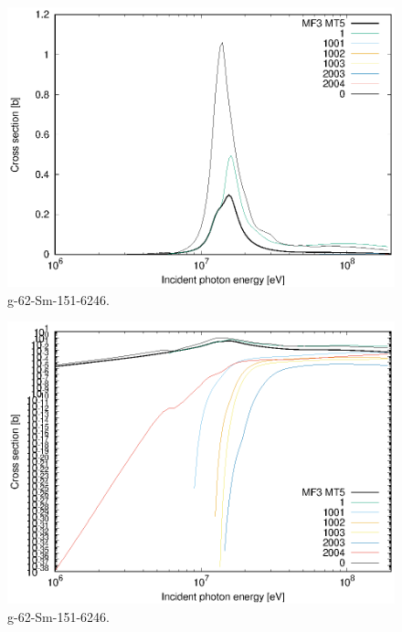 \begin{figure}
 \includegraphics[width=\linewidth]{eps/g_62-Sm-151_6246.eps}
  \caption{g-62-Sm-151-6246.}
\end{figure}
\begin{figure}
 \includegraphics[width=\linewidth]{eps-log/g_62-Sm-151_6246.eps}
 \caption{g-62-Sm-151-6246.}
\end{figure}
\newpage \clearpage

